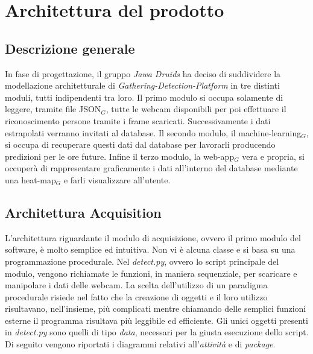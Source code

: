 \chapter{Architettura del prodotto}\label{ArchitetturaDelProdotto}

\section{Descrizione generale}
In fase di progettazione, il gruppo \textit{Jawa Druids} ha deciso di suddividere la modellazione architetturale di \textit{Gathering-Detection-Platform} in tre distinti moduli, tutti indipendenti tra loro.
Il primo modulo si occupa solamente di leggere, tramite file JSON$_G$, tutte le webcam disponibili per poi effettuare il riconoscimento persone tramite i frame scaricati. Successivamente i dati estrapolati verranno invitati al database.
Il secondo modulo, il machine-learning$_G$, si occupa di recuperare questi dati dal database per lavorarli producendo predizioni per le ore future.
Infine il terzo modulo, la web-app$_G$ vera e propria, si occuperà di rappresentare graficamente i dati all'interno del database mediante una heat-map$_G$ e farli visualizzare all'utente.

\section{Architettura Acquisition}\label{ArchitetturaDelProdottoAcquisition}
L'architettura riguardante il modulo di acquisizione, ovvero il primo modulo del software, è molto semplice ed intuitiva.
Non vi è alcuna classe e si basa su una programmazione procedurale.
Nel \textit{detect.py}, ovvero lo script principale del modulo, vengono richiamate le funzioni, in maniera sequenziale, per scaricare e manipolare i dati delle webcam.
La scelta dell'utilizzo di un paradigma procedurale risiede nel fatto che la creazione di oggetti e il loro utilizzo risultavano, nell'insieme, più complicati mentre chiamando delle semplici funzioni esterne il programma risultava più leggibile ed efficiente.
Gli unici oggetti presenti in \textit{detect.py} sono quelli di tipo \textit{data}, necessari per la giusta esecuzione dello script.
Di seguito vengono riportati i diagrammi relativi all'\textit{attività} e di \textit{package}.

